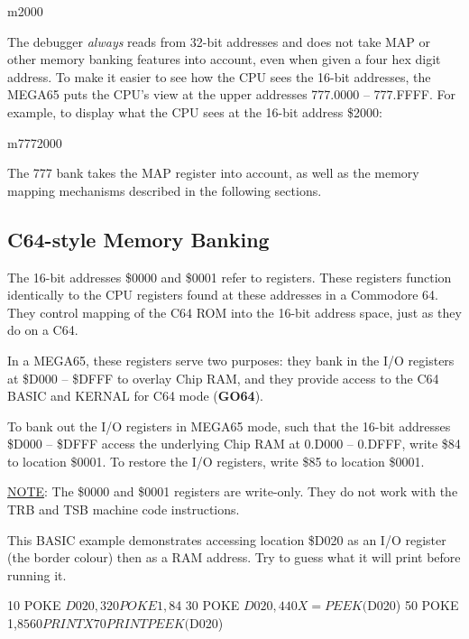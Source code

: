 \begin{basiccode}
m2000
\end{basiccode}

The debugger {\em always} reads from 32-bit addresses and does not take MAP or other memory banking features into account, even when given a four hex digit address. To make it easier to see how the CPU sees the 16-bit addresses, the MEGA65 puts the CPU's view at the upper addresses 777.0000 -- 777.FFFF. For example, to display what the CPU sees at the 16-bit address \$2000:

\begin{basiccode}
m7772000
\end{basiccode}

The 777 bank takes the MAP register into account, as well as the memory mapping mechanisms described in the following sections.

\subsection{C64-style Memory Banking}

The 16-bit addresses \$0000 and \$0001 refer to registers. These registers function identically to the CPU registers found at these addresses in a Commodore 64. They control mapping of the C64 ROM into the 16-bit address space, just as they do on a C64.

In a MEGA65, these registers serve two purposes: they bank in the I/O registers at \$D000 -- \$DFFF to overlay Chip RAM, and they provide access to the C64 BASIC and KERNAL for C64 mode (\textbf{GO64}).

To bank out the I/O registers in MEGA65 mode, such that the 16-bit addresses \$D000 -- \$DFFF access the underlying Chip RAM at 0.D000 -- 0.DFFF, write \$84 to location \$0001. To restore the I/O registers, write \$85 to location \$0001.

\underline{NOTE}: The \$0000 and \$0001 registers are write-only. They do not work with the TRB and TSB machine code instructions.

This BASIC example demonstrates accessing location \$D020 as an I/O register
(the border colour) then as a RAM address. Try to guess what it will print
before running it.

\begin{basiccode}
10 POKE $D020,3
20 POKE 1,$84
30 POKE $D020,4
40 X=PEEK($D020)
50 POKE 1,$85
60 PRINT X
70 PRINT PEEK($D020)
\end{basiccode}

